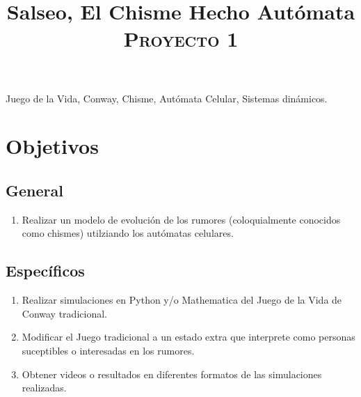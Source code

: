 \documentclass[conference]{IEEEtran}
\begin{document}
\title{Salseo, El Chisme Hecho Autómata \\
{\footnotesize \scshape{Proyecto 1}}
}

\author{
}



\maketitle

\begin{abstract}

\end{abstract}

\begin{IEEEkeywords}
	Juego de la Vida, Conway, Chisme, Autómata Celular, Sistemas dinámicos.
\end{IEEEkeywords}

\section{Objetivos}

\subsection{General}
    \begin{enumerate}[1.]
        \item Realizar un modelo de evolución de los rumores (coloquialmente conocidos como chismes) utilziando los autómatas celulares.
    \end{enumerate}
\subsection{Específicos}
    \begin{enumerate}
        \item Realizar simulaciones en Python y/o Mathematica del Juego de la Vida de Conway tradicional.
        \item Modificar el Juego tradicional a un estado extra que interprete como personas suceptibles o interesadas en los rumores.
        \item Obtener videos o resultados en diferentes formatos de las simulaciones realizadas.
    \end{enumerate}
    
\end{document}
